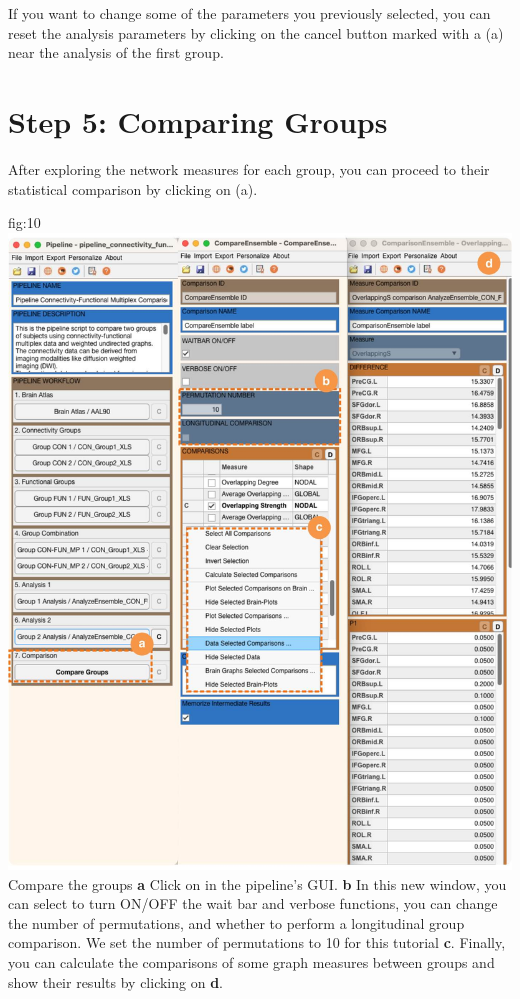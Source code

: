 \documentclass[justified]{tufte-handout}
\begin{document}
If you want to change some of the parameters you previously selected, you can reset the analysis parameters by clicking on the cancel button marked with a  (a) near the analysis of the first group.
 
\clearpage
\section{Step 5: Comparing Groups}

After exploring the network measures for each group, you can proceed to their statistical comparison by clicking on  (a).

	{fig:10}
	{
	\includegraphics{fig10.jpg}
	}
	{Compare the groups}
	{
	{\bf a} Click on  in the pipeline's GUI.
	{\bf b} In this new window, you can select to turn ON/OFF the wait bar and verbose functions, you can change the number of permutations, and whether to perform a longitudinal group comparison. We set the number of permutations to 10 for this tutorial {\bf c}. Finally, you can calculate the comparisons of some graph measures between groups and show their results by clicking on  {\bf d}.
	}
	
\end{document}
